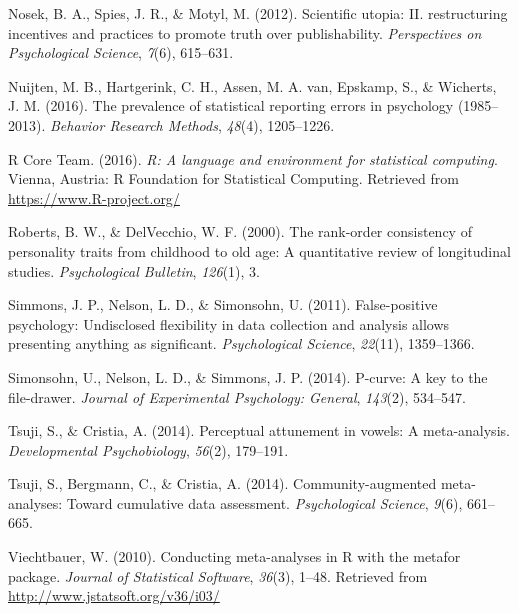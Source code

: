 \documentclass[english,floatsintext,man]{apa6}
\begin{document}
\hypertarget{ref-nosek2012scientific2}{}
Nosek, B. A., Spies, J. R., \& Motyl, M. (2012). Scientific utopia: II.
restructuring incentives and practices to promote truth over
publishability. \emph{Perspectives on Psychological Science},
\emph{7}(6), 615--631.

\hypertarget{ref-statcheck}{}
Nuijten, M. B., Hartgerink, C. H., Assen, M. A. van, Epskamp, S., \&
Wicherts, J. M. (2016). The prevalence of statistical reporting errors
in psychology (1985--2013). \emph{Behavior Research Methods},
\emph{48}(4), 1205--1226.

\hypertarget{ref-R}{}
R Core Team. (2016). \emph{R: A language and environment for statistical
computing}. Vienna, Austria: R Foundation for Statistical Computing.
Retrieved from \url{https://www.R-project.org/}

\hypertarget{ref-roberts2000rank}{}
Roberts, B. W., \& DelVecchio, W. F. (2000). The rank-order consistency
of personality traits from childhood to old age: A quantitative review
of longitudinal studies. \emph{Psychological Bulletin}, \emph{126}(1),
3.

\hypertarget{ref-Simmons2011}{}
Simmons, J. P., Nelson, L. D., \& Simonsohn, U. (2011). False-positive
psychology: Undisclosed flexibility in data collection and analysis
allows presenting anything as significant. \emph{Psychological Science},
\emph{22}(11), 1359--1366.

\hypertarget{ref-pcurve}{}
Simonsohn, U., Nelson, L. D., \& Simmons, J. P. (2014). P-curve: A key
to the file-drawer. \emph{Journal of Experimental Psychology: General},
\emph{143}(2), 534--547.

\hypertarget{ref-InPhonDB}{}
Tsuji, S., \& Cristia, A. (2014). Perceptual attunement in vowels: A
meta-analysis. \emph{Developmental Psychobiology}, \emph{56}(2),
179--191.

\hypertarget{ref-Tsuji2014}{}
Tsuji, S., Bergmann, C., \& Cristia, A. (2014). Community-augmented
meta-analyses: Toward cumulative data assessment. \emph{Psychological
Science}, \emph{9}(6), 661--665.

\hypertarget{ref-metafor}{}
Viechtbauer, W. (2010). Conducting meta-analyses in R with the metafor
package. \emph{Journal of Statistical Software}, \emph{36}(3), 1--48.
Retrieved from \url{http://www.jstatsoft.org/v36/i03/}
\end{document}
